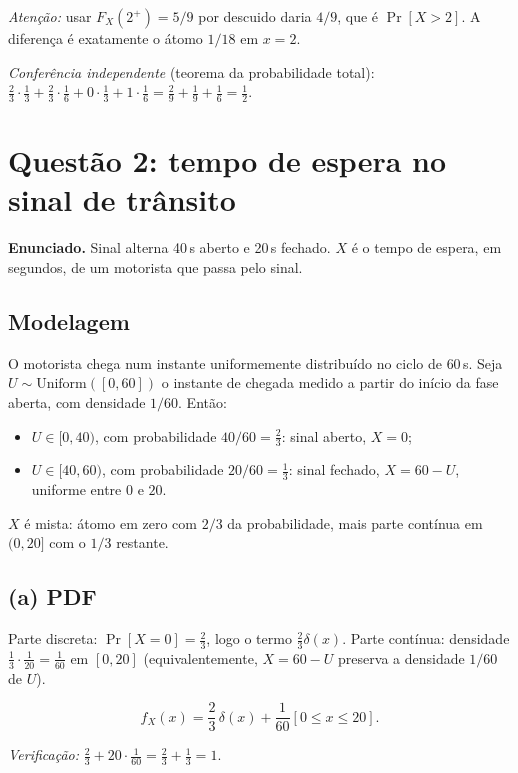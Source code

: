 \documentclass[11pt,a4paper]{article}
\newcommand{\Ind}[1]{\left[#1\right]}
\renewcommand{\Pr}{\operatorname{Pr}}
\begin{document}
\emph{Atenção:} usar $F_X(2^+)=5/9$ por descuido daria $4/9$, que é $\Pr[X>2]$.
A diferença é exatamente o átomo $1/18$ em $x=2$.

\emph{Conferência independente} (teorema da probabilidade total):
$\tfrac23\cdot\tfrac13+\tfrac23\cdot\tfrac16+0\cdot\tfrac13+1\cdot\tfrac16
=\tfrac29+\tfrac19+\tfrac16=\tfrac12$. \checkmark

\clearpage
\section{Questão 2: tempo de espera no sinal de trânsito}

\textbf{Enunciado.} Sinal alterna 40\,s aberto e 20\,s fechado. $X$ é o tempo de
espera, em segundos, de um motorista que passa pelo sinal.

\subsection*{Modelagem}

O motorista chega num instante uniformemente distribuído no ciclo de $60$\,s.
Seja $U\sim\text{Uniform}([0,60])$ o instante de chegada medido a partir do início
da fase aberta, com densidade $1/60$. Então:
\begin{itemize}[nosep,leftmargin=*]
\item $U\in[0,40)$, com probabilidade $40/60=\tfrac23$: sinal aberto, $X=0$;
\item $U\in[40,60)$, com probabilidade $20/60=\tfrac13$: sinal fechado,
      $X=60-U$, uniforme entre $0$ e $20$.
\end{itemize}

$X$ é mista: átomo em zero com $2/3$ da probabilidade, mais parte contínua em
$(0,20]$ com o $1/3$ restante.

\subsection*{(a) PDF}

Parte discreta: $\Pr[X=0]=\tfrac23$, logo o termo $\tfrac23\delta(x)$.
Parte contínua: densidade $\tfrac13\cdot\tfrac1{20}=\tfrac1{60}$ em $[0,20]$
(equivalentemente, $X=60-U$ preserva a densidade $1/60$ de $U$).

\begin{resp}
\[
f_X(x)=\frac23\,\delta(x)+\frac1{60}\Ind{0\le x\le 20}.
\]
\end{resp}

\emph{Verificação:} $\tfrac23 + 20\cdot\tfrac1{60}=\tfrac23+\tfrac13=1$. \checkmark
\end{document}
